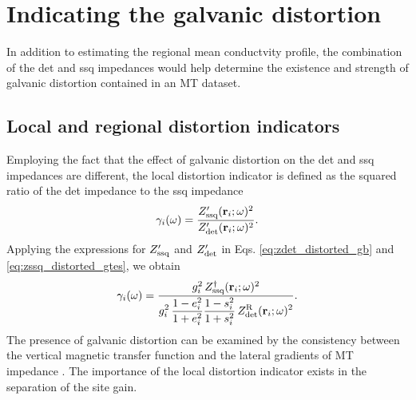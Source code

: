 


\section{Indicating the galvanic distortion}\label{sect:indicators}

In addition to estimating the regional mean conductvity profile, the combination of the det and ssq impedances would help determine the existence and strength of galvanic distortion contained in an MT dataset. 

\subsection{Local and regional distortion indicators}
Employing the fact that the effect of galvanic distortion on the det and ssq impedances are different, 
the local distortion indicator is defined as the squared ratio of the det impedance to the ssq impedance
\begin{equation}\label{eq:gamma_local_def}
	\gammai\fxomega = \frac{\ZssqDistorted\fxriomega^2}{\ZdetDistorted\fxriomega^2}.
\end{equation}
Applying the expressions for $Z_\text{ssq}'$ and $Z_\text{det}'$ in Eqs. \eqref{eq:zdet_distorted_gb} and \eqref{eq:zssq_distorted_gtes}, we obtain 
\begin{equation}
 	\gamma_i(\omega) = \frac{g_i^2\, Z_\text{ssq}^\dagger(\mathbf{r}_i;\omega)^2}{\displaystyle g_i^2\,  \frac{1-e_i^2}{1+e_i^2} \frac{1-s_i^2}{1+s_i^2}\, Z_\text{det}^{\text{R}}(\mathbf{r}_i;\omega)^2}. 
\end{equation}
The presence of galvanic distortion can be examined by the consistency between the vertical magnetic transfer function and the lateral gradients of MT impedance \citep{utada2000a, rung-arunwan2016a}. The importance of the local distortion indicator exists in the separation of the site gain.

